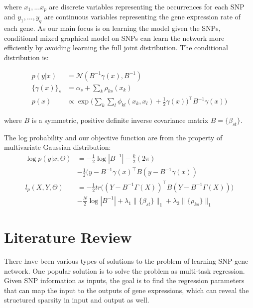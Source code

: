 \documentclass{article}
\begin{document}
where $x_1, ... x_p$ are discrete variables representing the occurrences for each SNP and $y_1, ..., y_q$ are continuous variables representing the gene expression rate of each gene. As our main focus is on learning the model given the SNPs, conditional mixed graphical model on SNPs can learn the network more efficiently by avoiding learning the full joint distribution. The conditional distribution is:

\begin{align}
p(y|x) &= \mathcal{N}(B^{-1}\gamma(x), B^{-1}) \label{eq:cond_prob}\\
\{\gamma(x)\}_s &= \alpha_s + \sum_{k} \rho_{ks}(x_k) \\
p(x) &\propto \exp \Big( \sum_{k} \sum_{l} \phi_{kl}(x_k, x_l) + \frac{1}{2} \gamma(x))^\intercal B^{-1} \gamma(x) \Big)
\end{align}

where $B$ is a symmetric, positive definite inverse covariance matrix $B = \{ \beta_{st}\}$.

The log probability and our objective function are from the property of multivariate Gaussian distribution:
\begin{align}
\log p(y | x; \Theta) &= -\frac{1}{2}\log |B^{-1}| -\frac{k}{2} (2 \pi) \nonumber \\
& -\frac{1}{2} (y - B^{-1} \gamma(x)^\intercal B (y - B^{-1} \gamma(x)) \\
l_p(X, Y, \Theta) &= -\frac{1}{2} tr\Big((Y - B^{-1} \Gamma(X))^\intercal B (Y - B^{-1} \Gamma(X)) \Big) \nonumber \\
& -\frac{N}{2} \log|B^{-1}| + \lambda_1 \|\{\beta_{st}\}\|_1 + \lambda_2 \|\{\rho_{ks}\}\|_1 \label{eq:obj}
\end{align}

\section{Literature Review}
\label{LiteratureReview}

There have been various types of solutions to the problem of learning SNP-gene network. One popular solution is to solve the problem as multi-task regression.
Given SNP information as inputs, the goal is to find the regression parameters that can map the input to the outputs of gene expressions, which can reveal the structured sparsity in input and output as well.

\end{document}
